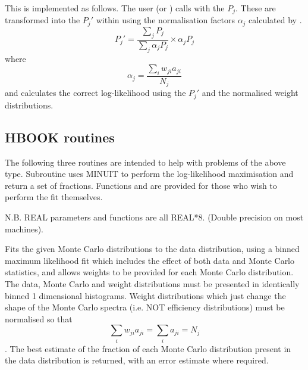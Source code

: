\begin{changebar}
This is implemented as follows.
The user (or ) calls  with the $P_j$.  These are transformed
into the $P_{j}\prime$ within  using the normalisation factors
$\alpha_j$ calculated by .
$$P_{j}\prime = \frac{\sum_j P_j}{\sum_j \alpha_j P_j} \times \alpha_j P_j$$
where
$$\alpha_j = \frac{\sum_i w_{ji} a_{ji}}{N_j}$$
and  calculates the correct log-likelihood using the $P_{j}\prime$
and the normalised weight distributions.
 
\subsection*{HBOOK routines}
 
The following three routines are intended to help with problems of the
above type.  Subroutine
 uses MINUIT to perform the log-likelihood maximisation and
return a set of fractions.  Functions  and  are
provided for those who wish to perform the fit themselves.
 
N.B. REAL parameters and functions are all REAL*8.
(Double precision on most machines).
 
 
\Action
Fits the given Monte Carlo distributions to the data distribution, using
a binned maximum likelihood fit which includes the effect of both data and
Monte Carlo statistics, and allows weights to be
provided for each Monte Carlo distribution.  The data, Monte Carlo and weight
distributions must be presented in identically binned 1 dimensional histograms.
Weight distributions which just change the shape of the Monte Carlo spectra
(i.e. NOT efficiency distributions) must be normalised so that
$$\sum_i w_{ji}a_{ji} = \sum_i a_{ji} = N_{j}$$.
The best estimate of the fraction of each Monte
Carlo distribution present in the data distribution is returned, with an
error estimate where required.
 

\end{changebar}
